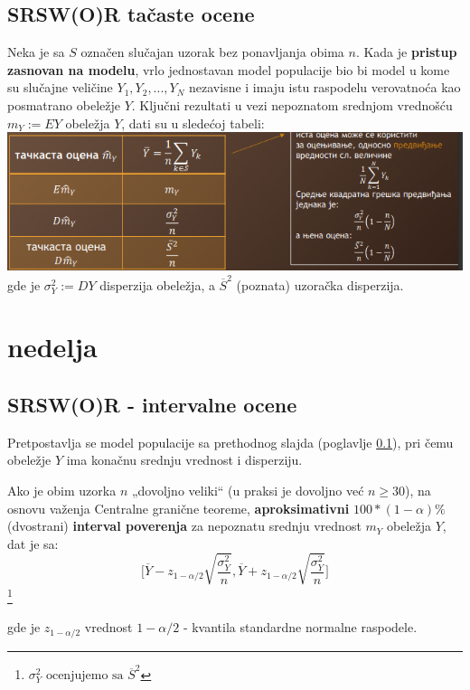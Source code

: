 \documentclass[10pt,a4paper,]{article}
\begin{document}
\subsection{SRSW(O)R tačaste ocene} \label{srswor_tackaste}
Neka je sa $S$ označen slučajan uzorak bez ponavljanja obima $n$. 
Kada je \textbf{pristup zasnovan na modelu}, 
vrlo jednostavan model populacije bio bi model u kome su slučajne veličine 
$Y_1,Y_2,...,Y_N$ nezavisne i imaju istu raspodelu verovatnoća kao posmatrano 
obeležje $Y$. Ključni rezultati u vezi nepoznatom 
srednjom vrednošću $m_Y:=EY$ obeležja $Y$, dati su u sledećoj 
tabeli:\\
\includegraphics[scale=0.6]{primer8.png}
gde je $\sigma_Y^2 := DY$ disperzija obeležja,
a $\overline{S}^2$ (poznata) uzoračka disperzija.

\section{nedelja}

\subsection{SRSW(O)R - intervalne ocene}
Pretpostavlja se model populacije sa prethodnog slajda
(poglavlje \ref{srswor_tackaste}), pri čemu obeležje $Y$ ima konačnu 
srednju vrednost i disperziju.

\textbullet Ako je obim uzorka $n$ „dovoljno veliki“ (u praksi je dovoljno već 
$n \geq 30$), na 
osnovu važenja Centralne granične teoreme, \textbf{aproksimativni} $100 * (1-\alpha)\%$
(dvostrani) 
\textbf{interval poverenja} za nepoznatu srednju vrednost $m_Y$ 
obeležja $Y$, dat je sa:
$$\Bigg[\overline{Y} - z_{1-\alpha /2}\sqrt{\frac{\sigma_{Y}^2}{n}},
	\overline{Y} + z_{1-\alpha /2}\sqrt{\frac{\sigma_{Y}^2}{n}}\Bigg]
$$\footnote{$\sigma_{Y}^2 \text{ ocenjujemo sa } \overline{S}^2$}

gde je $z_{1-\alpha /2}$ vrednost $1 - \alpha / 2$ - kvantila standardne normalne
raspodele.
\end{document}
